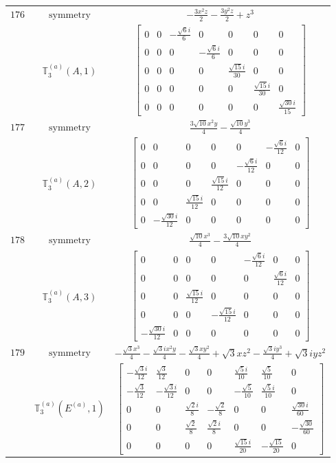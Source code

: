 \documentclass[fleqn,8pt,landscape]{jsarticle}
\begin{document}
\begin{longtable}{ccc}
$ 176 $ & $ \text{symmetry} $ & $ - \frac{3 x^{2} z}{2} - \frac{3 y^{2} z}{2} + z^{3} $ \\
$  $ & $ \mathbb{T}_{3}^{(a)}(A,1) $ & $ \begin{bmatrix} 0 & 0 & - \frac{\sqrt{6} i}{6} & 0 & 0 & 0 & 0 \\ 0 & 0 & 0 & - \frac{\sqrt{6} i}{6} & 0 & 0 & 0 \\ 0 & 0 & 0 & 0 & \frac{\sqrt{15} i}{30} & 0 & 0 \\ 0 & 0 & 0 & 0 & 0 & \frac{\sqrt{15} i}{30} & 0 \\ 0 & 0 & 0 & 0 & 0 & 0 & \frac{\sqrt{30} i}{15} \end{bmatrix} $ \\ \hline
$ 177 $ & $ \text{symmetry} $ & $ \frac{3 \sqrt{10} x^{2} y}{4} - \frac{\sqrt{10} y^{3}}{4} $ \\
$  $ & $ \mathbb{T}_{3}^{(a)}(A,2) $ & $ \begin{bmatrix} 0 & 0 & 0 & 0 & 0 & - \frac{\sqrt{6} i}{12} & 0 \\ 0 & 0 & 0 & 0 & - \frac{\sqrt{6} i}{12} & 0 & 0 \\ 0 & 0 & 0 & \frac{\sqrt{15} i}{12} & 0 & 0 & 0 \\ 0 & 0 & \frac{\sqrt{15} i}{12} & 0 & 0 & 0 & 0 \\ 0 & - \frac{\sqrt{30} i}{12} & 0 & 0 & 0 & 0 & 0 \end{bmatrix} $ \\ \hline
$ 178 $ & $ \text{symmetry} $ & $ \frac{\sqrt{10} x^{3}}{4} - \frac{3 \sqrt{10} x y^{2}}{4} $ \\
$  $ & $ \mathbb{T}_{3}^{(a)}(A,3) $ & $ \begin{bmatrix} 0 & 0 & 0 & 0 & - \frac{\sqrt{6} i}{12} & 0 & 0 \\ 0 & 0 & 0 & 0 & 0 & \frac{\sqrt{6} i}{12} & 0 \\ 0 & 0 & \frac{\sqrt{15} i}{12} & 0 & 0 & 0 & 0 \\ 0 & 0 & 0 & - \frac{\sqrt{15} i}{12} & 0 & 0 & 0 \\ - \frac{\sqrt{30} i}{12} & 0 & 0 & 0 & 0 & 0 & 0 \end{bmatrix} $ \\ \hline
$ 179 $ & $ \text{symmetry} $ & $ - \frac{\sqrt{3} x^{3}}{4} - \frac{\sqrt{3} i x^{2} y}{4} - \frac{\sqrt{3} x y^{2}}{4} + \sqrt{3} x z^{2} - \frac{\sqrt{3} i y^{3}}{4} + \sqrt{3} i y z^{2} $ \\
$  $ & $ \mathbb{T}_{3}^{(a)}(E^{(a)},1) $ & $ \begin{bmatrix} - \frac{\sqrt{3} i}{12} & \frac{\sqrt{3}}{12} & 0 & 0 & \frac{\sqrt{5} i}{10} & \frac{\sqrt{5}}{10} & 0 \\ - \frac{\sqrt{3}}{12} & - \frac{\sqrt{3} i}{12} & 0 & 0 & - \frac{\sqrt{5}}{10} & \frac{\sqrt{5} i}{10} & 0 \\ 0 & 0 & \frac{\sqrt{2} i}{8} & - \frac{\sqrt{2}}{8} & 0 & 0 & \frac{\sqrt{30} i}{60} \\ 0 & 0 & \frac{\sqrt{2}}{8} & \frac{\sqrt{2} i}{8} & 0 & 0 & - \frac{\sqrt{30}}{60} \\ 0 & 0 & 0 & 0 & \frac{\sqrt{15} i}{20} & - \frac{\sqrt{15}}{20} & 0 \end{bmatrix} $ \\ \hline

\end{longtable}
\end{document}
